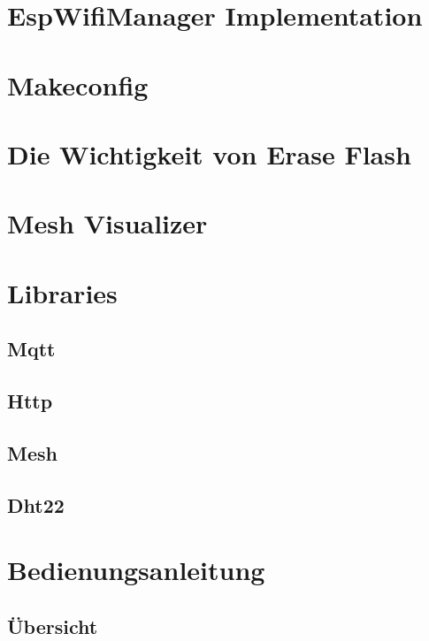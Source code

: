 \section{EspWifiManager Implementation}

\section{Makeconfig}

\section{Die Wichtigkeit von Erase Flash}

\section{Mesh Visualizer}\label{sec:mesh-visualizer}

\section{Libraries}

\subsection{Mqtt}
\subsection{Http}
\subsection{Mesh}
\subsection{Dht22}

\section{Bedienungsanleitung}

\subsection{Übersicht}

